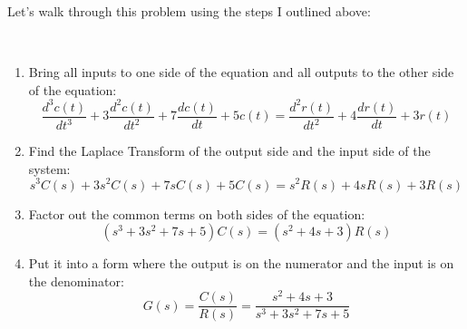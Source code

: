 \documentclass{article}
\theoremstyle{mytheoremstyle}
\theoremstyle{mytheoremstyle}
\theoremstyle{myproblemstyle}
\theoremstyle{break}
\begin{document}
Let's walk through this problem using the steps I outlined above:

\begin{solution}[\textcolor{blue}{A Simple Transfer Function}]~
	\begin{enumerate}
		\item Bring all inputs to one side of the equation and all outputs to the other side of the equation:
		      \begin{equation}
			      \frac{d^3c(t)}{dt^3} + 3\frac{d^2c(t)}{dt^2} + 7\frac{dc(t)}{dt} + 5c(t) = \frac{d^2r(t)}{dt^2} + 4\frac{dr(t)}{dt} + 3r(t)
		      \end{equation}
		\item Find the Laplace Transform of the output side and the input side of the system:
		      \begin{equation}
			    s^3C(s) + 3s^2C(s) + 7sC(s) + 5C(s) = s^2R(s) + 4sR(s) + 3R(s)
		      \end{equation}
		\item Factor out the common terms on both sides of the equation:
		      \begin{equation}
				 (s^{3} + 3 s^{2} + 7 s + 5 )C{(s)} = (s^{2} + 4 s + 3)R{(s)}
		      \end{equation}
		\item Put it into a form where the output is on the numerator and the input is on the denominator:
		      \begin{equation}
			      G(s) = \frac{C(s)}{R(s)} = \frac{s^{2} + 4 s + 3}{s^{3} + 3 s^{2} + 7 s + 5}
		      \end{equation}
	\end{enumerate}
\end{solution}

\end{document}
